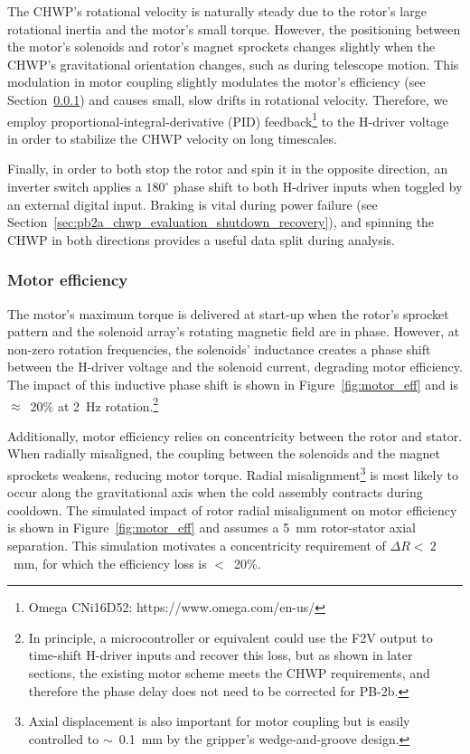 The CHWP's rotational velocity is naturally steady due to the rotor's large rotational inertia and the motor's small torque. However, the positioning between the motor's solenoids and rotor's magnet sprockets changes slightly when the CHWP's gravitational orientation changes, such as during telescope motion. This modulation in motor coupling slightly modulates the motor's efficiency (see Section~\ref{sec:motor_eff}) and causes small, slow drifts in rotational velocity. Therefore, we employ proportional-integral-derivative (PID) feedback\footnote{Omega CNi16D52: https://www.omega.com/en-us/} to the H-driver voltage in order to stabilize the CHWP velocity on long timescales.

Finally, in order to both stop the rotor and spin it in the opposite direction, an inverter switch applies a $180^{\circ}$ phase shift to both H-driver inputs when toggled by an external digital input. Braking is vital during power failure (see Section~\ref{sec:pb2a_chwp_evaluation_shutdown_recovery}), and spinning the CHWP in both directions provides a useful data split during analysis.


\subsubsection{Motor efficiency}
\label{sec:motor_eff} 

The motor's maximum torque is delivered at start-up when the rotor's sprocket pattern and the solenoid array's rotating magnetic field are in phase. However, at non-zero rotation frequencies, the solenoids' inductance creates a phase shift between the H-driver voltage and the solenoid current, degrading motor efficiency. The impact of this inductive phase shift is shown in Figure~\ref{fig:motor_eff} and is $\approx$~20\% at 2~Hz rotation.\footnote{In principle, a microcontroller or equivalent could use the F2V output to time-shift H-driver inputs and recover this loss, but as shown in later sections, the existing motor scheme meets the CHWP requirements, and therefore the phase delay does not need to be corrected for PB-2b.} 

Additionally, motor efficiency relies on concentricity between the rotor and stator. When radially misaligned, the coupling between the solenoids and the magnet sprockets weakens, reducing motor torque. Radial misalignment\footnote{Axial displacement is also important for motor coupling but is easily controlled to $\sim$~0.1~mm by the gripper's wedge-and-groove design.} is most likely to occur along the gravitational axis when the cold assembly contracts during cooldown. The simulated impact of rotor radial misalignment on motor efficiency is shown in Figure~\ref{fig:motor_eff} and assumes a 5~mm rotor-stator axial separation. This simulation motivates a concentricity requirement of $\Delta R <  \: 2$~mm, for which the efficiency loss is $<$~20\%. 

